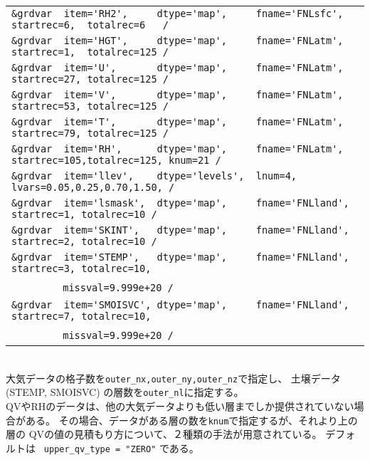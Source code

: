 {{{\begin{tabularx}{150mm}{l}
\verb|&grdvar  item='RH2',     dtype='map',     fname='FNLsfc', startrec=6,  totalrec=6   / |  \\
\verb|&grdvar  item='HGT',     dtype='map',     fname='FNLatm', startrec=1,  totalrec=125 / |  \\
\verb|&grdvar  item='U',       dtype='map',     fname='FNLatm', startrec=27, totalrec=125 / |  \\
\verb|&grdvar  item='V',       dtype='map',     fname='FNLatm', startrec=53, totalrec=125 / |  \\
\verb|&grdvar  item='T',       dtype='map',     fname='FNLatm', startrec=79, totalrec=125 / |  \\
\verb|&grdvar  item='RH',      dtype='map',     fname='FNLatm', startrec=105,totalrec=125, knum=21 /  |  \\
\verb|&grdvar  item='llev',    dtype='levels',  lnum=4, lvars=0.05,0.25,0.70,1.50, /        |  \\
\verb|&grdvar  item='lsmask',  dtype='map',     fname='FNLland', startrec=1, totalrec=10 /  |  \\
\verb|&grdvar  item='SKINT',   dtype='map',     fname='FNLland', startrec=2, totalrec=10 /  |  \\
\verb|&grdvar  item='STEMP',   dtype='map',     fname='FNLland', startrec=3, totalrec=10,|\\
~~~~~~~~\verb| missval=9.999e+20 /|  \\
\verb|&grdvar  item='SMOISVC', dtype='map',     fname='FNLland', startrec=7, totalrec=10,|\\
~~~~~~~~\verb| missval=9.999e+20 /|  \\
\end{tabularx}
}}}\\

大気データの格子数を\verb|outer_nx,outer_ny,outer_nz|で指定し、
土壌データ(STEMP, SMOISVC) の層数を\verb|outer_nl|に指定する。\\

QVやRHのデータは、他の大気データよりも低い層までしか提供されていない場合がある。
その場合、データがある層の数を\verb|knum|で指定するが、それより上の層の
QVの値の見積もり方について、２種類の手法が用意されている。
デフォルトは \verb| upper_qv_type = "ZERO"| である。\\

\\



